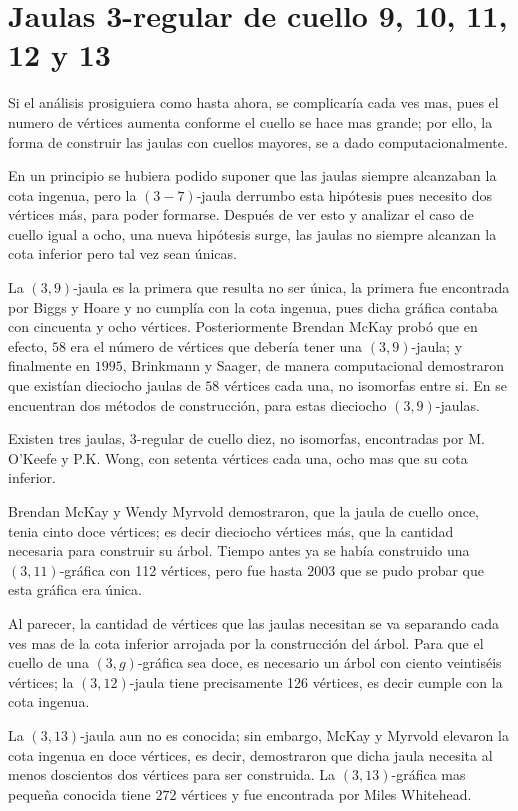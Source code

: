 \documentclass[11pt]{book}
\theoremstyle{definition}
\begin{document}
\section{Jaulas 3-regular de cuello 9, 10, 11, 12 y 13 }

Si el análisis prosiguiera como hasta ahora, se complicaría cada ves
mas, pues el numero de vértices aumenta conforme el cuello se hace mas
grande; por ello, la forma de construir las jaulas con cuellos
mayores, se a dado computacionalmente.

En un principio se hubiera podido suponer que las jaulas siempre
alcanzaban la cota ingenua, pero la $(3-7)$-jaula derrumbo esta
hipótesis pues necesito dos vértices m\'as, para poder
formarse. Después de ver esto y analizar el caso de cuello igual a
ocho, una nueva hipótesis surge, las jaulas no siempre alcanzan la
cota inferior pero tal vez sean únicas.

La $(3,9)$-jaula es la primera que resulta no ser única, la primera
fue encontrada por Biggs y Hoare y no cumplía con la cota ingenua,
pues dicha gráfica contaba con cincuenta y ocho
vértices. Posteriormente Brendan McKay probó que en efecto, $58$ era
el n\'umero de vértices que debería tener una $(3,9)$-jaula; y
finalmente en $1995$, Brinkmann y Saager, de manera computacional
demostraron que existían dieciocho jaulas de $58$ vértices cada una,
no isomorfas entre si. En \cite{9jaula} se encuentran dos métodos de
construcción, para estas dieciocho $(3,9)$-jaulas.

Existen tres jaulas, 3-regular de cuello diez, no isomorfas,
encontradas por M. O'Keefe y P.K. Wong, con setenta vértices cada una,
ocho mas que su cota inferior.

Brendan McKay y Wendy Myrvold demostraron, que la jaula de cuello
once, tenia cinto doce vértices; es decir dieciocho vértices m\'as,
que la cantidad necesaria para construir su árbol. Tiempo antes ya se
había construido una $(3,11)$-gráfica con 112 vértices, pero fue hasta
$2003$ que se pudo probar que esta gráfica era única.

Al parecer, la cantidad de vértices que las jaulas necesitan se va
separando cada ves mas de la cota inferior arrojada por la
construcción del árbol. Para que el cuello de una $(3,g)$-gráfica sea
doce, es necesario un árbol con ciento veintiséis vértices; la
$(3,12)$-jaula tiene precisamente 126 vértices, es decir cumple con la
cota ingenua.

La $(3,13)$-jaula aun no es conocida; sin embargo, McKay y Myrvold
elevaron la cota ingenua en doce vértices, es decir, demostraron que
dicha jaula necesita al menos doscientos dos vértices para ser
construida. La $(3,13)$-gráfica mas pequeña conocida tiene $272$
vértices y fue encontrada por Miles Whitehead.
\end{document}
